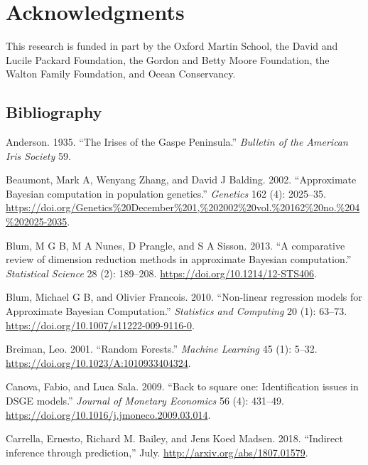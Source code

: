 \documentclass[]{article}
\begin{document}
\hypertarget{acknowledgments}{%
\section*{Acknowledgments}\label{acknowledgments}}

This research is funded in part by the Oxford Martin School, the David and Lucile Packard Foundation, the Gordon and Betty Moore Foundation, the Walton Family Foundation, and Ocean Conservancy.

\hypertarget{bibliography}{%
\subsection*{Bibliography}\label{bibliography}}

\hypertarget{refs}{}
\leavevmode\hypertarget{ref-Anderson1935}{}%
Anderson. 1935. ``The Irises of the Gaspe Peninsula.'' \emph{Bulletin of the American Iris Society} 59.

\leavevmode\hypertarget{ref-Beaumont2002}{}%
Beaumont, Mark A, Wenyang Zhang, and David J Balding. 2002. ``Approximate Bayesian computation in population genetics.'' \emph{Genetics} 162 (4): 2025--35. \url{https://doi.org/Genetics\%20December\%201,\%202002\%20vol.\%20162\%20no.\%204\%202025-2035}.

\leavevmode\hypertarget{ref-Blum2013}{}%
Blum, M G B, M A Nunes, D Prangle, and S A Sisson. 2013. ``A comparative review of dimension reduction methods in approximate Bayesian computation.'' \emph{Statistical Science} 28 (2): 189--208. \url{https://doi.org/10.1214/12-STS406}.

\leavevmode\hypertarget{ref-Blum2010}{}%
Blum, Michael G B, and Olivier Francois. 2010. ``Non-linear regression models for Approximate Bayesian Computation.'' \emph{Statistics and Computing} 20 (1): 63--73. \url{https://doi.org/10.1007/s11222-009-9116-0}.

\leavevmode\hypertarget{ref-Breiman2001}{}%
Breiman, Leo. 2001. ``Random Forests.'' \emph{Machine Learning} 45 (1): 5--32. \url{https://doi.org/10.1023/A:1010933404324}.

\leavevmode\hypertarget{ref-Canova2005}{}%
Canova, Fabio, and Luca Sala. 2009. ``Back to square one: Identification issues in DSGE models.'' \emph{Journal of Monetary Economics} 56 (4): 431--49. \url{https://doi.org/10.1016/j.jmoneco.2009.03.014}.

\leavevmode\hypertarget{ref-Carrella2018}{}%
Carrella, Ernesto, Richard M. Bailey, and Jens Koed Madsen. 2018. ``Indirect inference through prediction,'' July. \url{http://arxiv.org/abs/1807.01579}.
\end{document}
